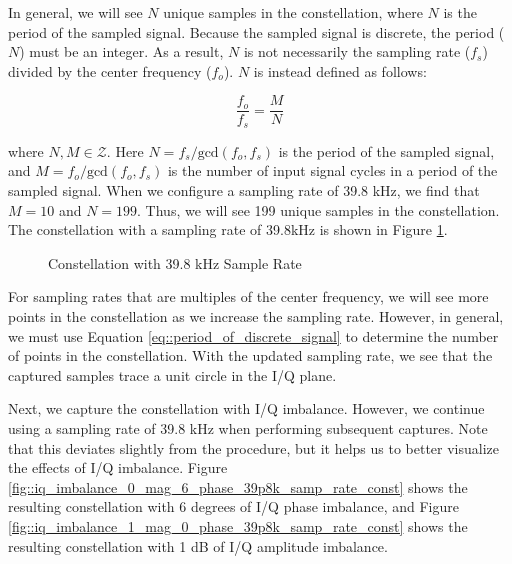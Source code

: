 \documentclass{article}
\begin{document}
In general, we will see $N$ unique samples in the constellation, where $N$ is the period of the sampled signal. Because the sampled signal is discrete, the period ($N$) must be an integer. As a result, $N$ is not necessarily the sampling rate ($f_s$) divided by the center frequency ($f_o$). $N$ is instead defined as follows:

\begin{equation}
	\frac{f_o}{f_s} = \frac{M}{N} \label{eq::period_of_discrete_signal}
\end{equation}

where $N, M \in \mathcal{Z}$. Here $N=f_s/\text{gcd}(f_o,f_s)$ is the period of the sampled signal, and $M=f_o/\text{gcd}(f_o,f_s)$ is the number of input signal cycles in a period of the sampled signal. When we configure a sampling rate of 39.8 kHz, we find that $M=10$ and $N=199$. Thus, we will see 199 unique samples in the constellation. The constellation with a sampling rate of 39.8kHz is shown in Figure \ref{fig::iq_imbalance_0_mag_0_phase_39p8k_samp_rate_const}.

\begin{figure}[H]
	\centerline{}
	\caption{Constellation with 39.8 kHz Sample Rate}
	\label{fig::iq_imbalance_0_mag_0_phase_39p8k_samp_rate_const}
\end{figure}

For sampling rates that are multiples of the center frequency, we will see more points in the constellation as we increase the sampling rate. However, in general, we must use Equation \ref{eq::period_of_discrete_signal} to determine the number of points in the constellation. With the updated sampling rate, we see that the captured samples trace a unit circle in the I/Q plane.

Next, we capture the constellation with I/Q imbalance. However, we continue using a sampling rate of 39.8 kHz when performing subsequent captures. Note that this deviates slightly from the procedure, but it helps us to better visualize the effects of I/Q imbalance. Figure \ref{fig::iq_imbalance_0_mag_6_phase_39p8k_samp_rate_const} shows the resulting constellation with 6 degrees of I/Q phase imbalance, and Figure \ref{fig::iq_imbalance_1_mag_0_phase_39p8k_samp_rate_const} shows the resulting constellation with 1 dB of I/Q amplitude imbalance.
\end{document}
